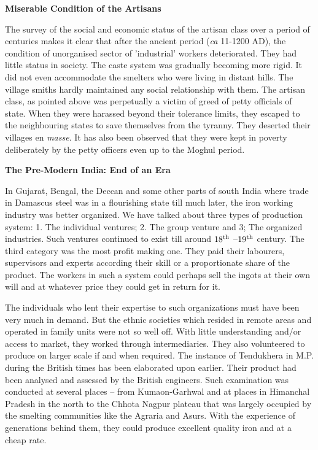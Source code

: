 \noindent \textbf{\large Miserable Condition of the Artisans}

The survey of the social and economic status of the artisan class over a period of centuries makes it clear that after the ancient period ({\it ca} 11-1200 AD), the condition of unorganised sector of 'industrial' workers deteriorated. They had little status in society. The caste system was gradually becoming more rigid. It did not even accommodate the smelters who were living in distant hills. The village smiths hardly maintained any social relationship with them. The artisan class, as pointed above was perpetually a victim of greed of petty officials of state. When they were harassed beyond their tolerance limits, they escaped to the neighbouring states to save themselves from the tyranny. They deserted their villages en {\it masse}. It has also been observed that they were kept in poverty deliberately by the petty officers even up to the Moghul period.

\noindent \textbf{\large The Pre-Modern India: End of an Era}

In Gujarat, Bengal, the Deccan and some other parts of south India where trade in Damascus steel was in a flourishing state till much later, the iron working industry was better organized. We have talked about three types of production system: 1. The individual ventures; 2. The group venture and 3; The organized industries. Such ventures continued to exist till around $18^{\rm th}$ –$19^{\rm th}$ century. The third category was the most profit making one. They paid their labourers, supervisors and experts according their skill or a proportionate share of the product. The workers in such a system could perhaps sell the ingots at their own will and at whatever price they could get in return for it. 

The individuals who lent their expertise to such organizations must have been very much in demand. But the ethnic societies which resided in remote areas and operated in family units were not so well off. With little understanding and/or access to market, they worked through intermediaries. They also volunteered to produce on larger scale if and when required. The instance of Tendukhera in M.P. during the British times has been elaborated upon earlier. Their product had been analysed and assessed by the British engineers. Such examination was conducted at several places – from Kumaon-Garhwal and at places in Himanchal Pradesh in the north to the Chhota Nagpur plateau that was largely occupied by the smelting communities like the Agraria and Asurs. With the experience of generations behind them, they could produce excellent quality iron and at a cheap rate. 

